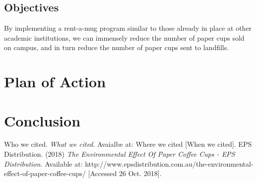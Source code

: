 \documentclass[letterpaper,11pt]{texMemo} %
\begin{document}
\subsection*{Objectives}
By implementing a rent-a-mug program similar to those already in place at
other academic institutions,%
we can immensely reduce the number of paper cups sold on campus, and in
turn reduce the number of paper cups sent to landfills.

\section*{Plan of Action}

\section*{Conclusion}

\begin{thebibliography}{9}
	Who we cited.
	\textit{What we cited}.
	Avaialbe at: Where we cited
	[When we cited].
	EPS Distribution. (2018)
	\textit{The Environmental Effect Of Paper Coffee Cups \-- EPS Distribution.}
	Available at:
	http://www.epsdistribution.com.au/the-environmental-effect-of-paper-coffee-cups/
	[Accessed 26 Oct. 2018].

\end{thebibliography}
\end{document}
